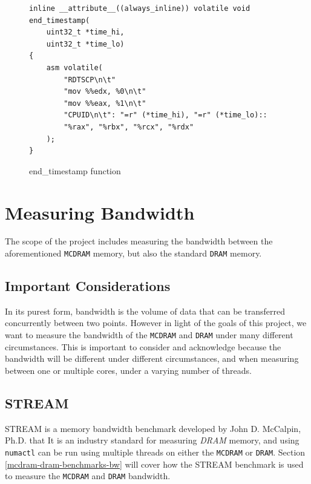 \documentclass[bsc,frontabs,twoside,singlespacing,parskip,deptreport]{infthesis}     %
\begin{document}
\begin{figure}[h!]
    \centering
    \begin{verbatim}
inline __attribute__((always_inline)) volatile void end_timestamp(
    uint32_t *time_hi,
    uint32_t *time_lo)
{
    asm volatile(
        "RDTSCP\n\t"
        "mov %%edx, %0\n\t"
        "mov %%eax, %1\n\t"
        "CPUID\n\t": "=r" (*time_hi), "=r" (*time_lo)::
        "%rax", "%rbx", "%rcx", "%rdx"
    );
}
    \end{verbatim}
    \caption{end\_timestamp function}
    \label{fig:endtimestamp-code}
\end{figure}

\newpage
\section{Measuring Bandwidth}
The scope of the project includes measuring the bandwidth between the aforementioned \texttt{MCDRAM} memory, but also the standard \texttt{DRAM} memory.

\subsection{Important Considerations}\label{bandwidth_considerations}
In its purest form, bandwidth is the volume of data that can be transferred concurrently between two points. However in light of the goals of this project, we want to measure the bandwidth of the \texttt{MCDRAM} and \texttt{DRAM} under many different circumstances. This is important to consider and acknowledge because the bandwidth will be different under different circumstances, and when measuring between one or multiple cores, under a varying number of threads.

\subsection{STREAM\cite{STREAM}}
STREAM is a memory bandwidth benchmark developed by John D. McCalpin, Ph.D. that \cite{STREAM_FAQ} It is an industry standard for measuring \textit{DRAM} memory, and using \texttt{numactl}\cite{numactl_repo}\cite{numactl_man} can be run using multiple threads on either the \texttt{MCDRAM} or \texttt{DRAM}. Section \ref{mcdram-dram-benchmarks-bw} will cover how the STREAM benchmark is used to measure the \texttt{MCDRAM} and \texttt{DRAM} bandwidth.
\end{document}
